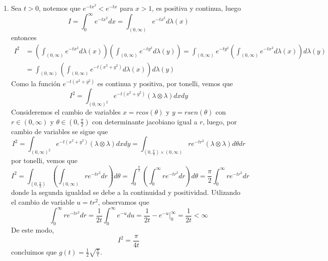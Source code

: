 \documentclass{article}
\begin{document}
\begin{enumerate}
    \item Sea $t>0$, notemos que $e^{-tx^{2}}<e^{-tx}$ para $x>1$, es positiva y continua, luego
    \begin{equation*}
        I=\int_{0}^{\infty}e^{-tx^{2}}dx=\int_{(0,\infty)}e^{-tx^{2}}d\lambda(x)
    \end{equation*}
    entonces
    \begin{align*}
        I^{2} &= \left(\int_{(0,\infty)}e^{-tx^{2}}d\lambda(x)\right)
        \left(\int_{(0,\infty)}e^{-ty^{2}}d\lambda(y)\right)
        =\int_{(0,\infty)}e^{-ty^{2}}\left(\int_{(0,\infty)}e^{-tx^{2}}d\lambda(x)\right)
        d\lambda(y) \\[2mm]
        &= \int_{(0,\infty)}\left(\int_{(0,\infty)}e^{-t(x^{2}+y^{2})}d\lambda(x)\right)d\lambda(y)
    \end{align*}
    Como la función $e^{-t(x^{2}+y^{2})}$ es continua y positiva, por tonelli, vemos que
    \begin{equation*}
        I^{2}=\int_{(0,\infty)^{2}}e^{-t(x^{2}+y^{2})}(\lambda\otimes\lambda)dxdy
    \end{equation*}
    Consideremos el cambio de variables $x=rcos(\theta)$ y $y=rsen(\theta)$ con $r\in(0,\infty)$ y 
    $\theta\in(0,\frac{\pi}{2})$ con determinante jacobiano igual a $r$, luego, por cambio de 
    variables se sigue que
    \begin{equation*}
        I^{2}=\int_{(0,\infty)^{2}}e^{-t(x^{2}+y^{2})}(\lambda\otimes\lambda)dxdy
        =\int_{\left(0,\frac{\pi}{2}\right)\times(0,\infty)}re^{-tr^{2}}(\lambda\otimes\lambda)
        d\theta dr
    \end{equation*}
    por tonelli, vemos que
    \begin{equation*}
        I^{2}=\int_{\left(0,\frac{\pi}{2}\right)}\left(\int_{(0,\infty)}re^{-tr^{2}}
        dr\right)d\theta
        =\int_{0}^{\frac{\pi}{2}}\left(\int_{0}^{\infty}re^{-tr^{2}}
        dr\right)d\theta
        =\frac{\pi}{2}\int_{0}^{\infty}re^{-tr^{2}}dr
    \end{equation*}
    donde la segunda igualdad se debe a la continuidad y positividad. Utlizando el cambio de 
    variable $u=tr^{2}$, observamos que
    \begin{equation*}
        \int_{0}^{\infty}re^{-tr^{2}}dr=\frac{1}{2t}\int_{0}^{\infty}e^{-u}du
        =\frac{1}{2t}-e^{-u}\Big|_{0}^{\infty}=\frac{1}{2t}<\infty
    \end{equation*}
    De este modo,
    \begin{equation*}
        I^{2}=\frac{\pi}{4t}
    \end{equation*}
    concluimos que $g(t)=\frac{1}{2}\sqrt{\frac{\pi}{t}}$.
    \newpage
    

\end{enumerate}
\end{document}
